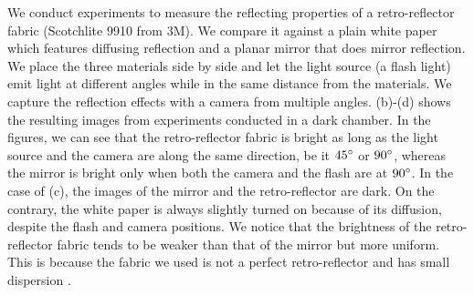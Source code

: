 
We conduct experiments to measure the reflecting properties of a retro-reflector fabric (Scotchlite 9910 from 3M). We compare it against a plain white paper which features diffusing reflection and a planar mirror that does mirror reflection. We place the three materials side by side and let the light source (a flash light) emit light at different angles while in the same distance from the materials. We capture the reflection effects with a camera from multiple angles. (b)-(d) shows the resulting images from experiments conducted in a dark chamber. In the figures, we can see that the retro-reflector fabric is bright as long as the light source and the camera are along the same direction, be it $45\degree$ or $90\degree$, whereas the mirror is bright only when both the camera and the flash are at $90\degree$. In the case of (c), the images of the mirror and the retro-reflector are dark. On the contrary, the white paper is always slightly turned on  because of its diffusion, despite the flash and camera positions.  
We notice that the brightness of the retro-reflector fabric tends to be weaker than that of the mirror but more uniform. This is because the fabric we used is not a perfect retro-reflector and has small dispersion \cite{rrsheet}. %


